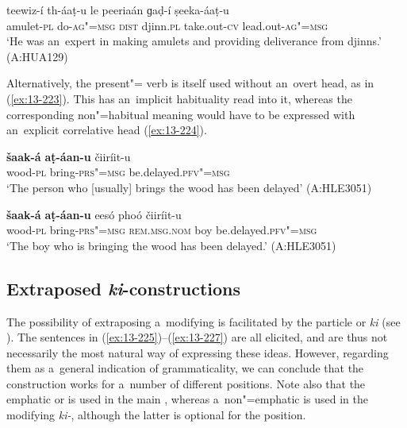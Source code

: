 \ea
\label{ex:13-222}
\gll teewiz-í th-áaṭ-u le peeriaán ɡaḍ-í  ṣeeka-áaṭ-u \\
amulet-\textsc{pl} do-\textsc{ag"=msg} \textsc{dist} djinn.\textsc{pl} take.out-\textsc{cv} lead.out-\textsc{ag"=msg} \\
\glt `He was an~expert in making amulets and providing deliverance from djinns.' (A:HUA129) 
\z

Alternatively, the present"= verb is itself used without an~overt head, as in (\ref{ex:13-223}). This has an~implicit habituality read into it, whereas the corresponding non"=habitual meaning would have to be expressed with an~explicit correlative head (\ref{ex:13-224}).

\begin{exe}
\ex
\label{ex:13-223}
\gll \textbf{šaak-á} \textbf{aṭ-áan-u} čiiríit-u  \\
wood-\textsc{pl} bring-\textsc{prs"=msg} be.delayed.\textsc{pfv"=msg} \\
\glt `The person who [usually] brings the wood has been delayed' (A:HLE3051)

\ex
\label{ex:13-224}
\gll \textbf{šaak-á} \textbf{aṭ-áan-u} eesó phoó čiiríit-u  \\
wood-\textsc{pl} bring-\textsc{prs"=msg} \textsc{rem.ms}\textsc{g.}\textsc{nom} boy be.delayed.\textsc{pfv"=msg}  \\
\glt `The boy who is bringing the wood has been delayed.' (A:HLE3051)
\end{exe}

\subsection{Extraposed \textit{ki}-constructions}
\label{subsec:13-6-7}

The possibility of extraposing a~modifying  is facilitated by the particle or  \textit{ki} (see ). The sentences in (\ref{ex:13-225})--(\ref{ex:13-227}) are all elicited, and are thus not necessarily the most natural way of expressing these ideas. However, regarding them as a~general indication of grammaticality, we can conclude that the construction works for a~number of different positions. Note also that the emphatic or   is used in the main , whereas a~non"=emphatic   is used in the modifying \textit{ki-}, although the latter is optional for the  position.


